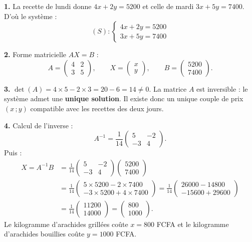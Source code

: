 \documentclass[11pt]{article}
\begin{document}
\begin{corrige}
\textbf{1.} La recette de lundi donne $4x + 2y = \num{5200}$ et celle de mardi $3x + 5y = \num{7400}$. D'où le système :
\[ (S) : \begin{cases} 4x + 2y = \num{5200} \\ 3x + 5y = \num{7400} \end{cases} \]

\textbf{2.} Forme matricielle $AX = B$ :
\[ A = \begin{pmatrix} 4 & 2 \\ 3 & 5 \end{pmatrix}, \qquad X = \begin{pmatrix} x \\ y \end{pmatrix}, \qquad B = \begin{pmatrix} \num{5200} \\ \num{7400} \end{pmatrix}. \]

\textbf{3.} $\det(A) = 4\times 5 - 2\times 3 = 20 - 6 = 14 \neq 0$. La matrice $A$ est inversible : le système admet une \textbf{unique solution}. Il existe donc un unique couple de prix $(x\,; y)$ compatible avec les recettes des deux jours.

\textbf{4.} Calcul de l'inverse :
\[ A^{-1} = \frac{1}{14}\begin{pmatrix} 5 & -2 \\ -3 & 4 \end{pmatrix}. \]
Puis :
\begin{align*}
X = A^{-1}B &= \frac{1}{14}\begin{pmatrix} 5 & -2 \\ -3 & 4 \end{pmatrix}\begin{pmatrix} \num{5200} \\ \num{7400} \end{pmatrix} \\
&= \frac{1}{14}\begin{pmatrix} 5\times \num{5200} - 2\times \num{7400} \\ -3\times \num{5200} + 4\times \num{7400} \end{pmatrix}
= \frac{1}{14}\begin{pmatrix} \num{26000} - \num{14800} \\ -\num{15600} + \num{29600} \end{pmatrix} \\
&= \frac{1}{14}\begin{pmatrix} \num{11200} \\ \num{14000} \end{pmatrix}
= \begin{pmatrix} 800 \\ \num{1000} \end{pmatrix}.
\end{align*}
Le kilogramme d'arachides grillées coûte $x = 800$ FCFA et le kilogramme d'arachides bouillies coûte $y = \num{1000}$ FCFA.


\end{corrige}
\end{document}
